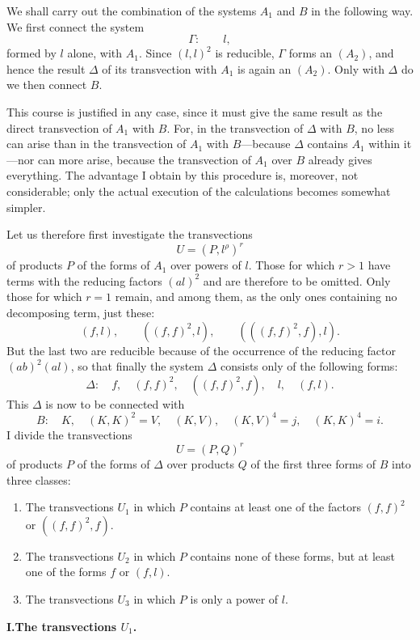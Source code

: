 \documentclass[10pt]{article}
\begin{document}
We shall carry out the combination of the systems $A_1$ and $B$ in the following way. We first connect the system
\[
\Gamma:
\qquad l,
\]
formed by $l$ alone, with $A_1$. Since $(l,l)^2$ is reducible, $\Gamma$ forms an $(A_2)$, and hence the result $\Delta$ of its transvection with $A_1$ is again an $(A_2)$. Only with $\Delta$ do we then connect $B$.

This course is justified in any case, since it must give the same result as the direct transvection of $A_1$ with $B$. For, in the transvection of $\Delta$ with $B$, no less can arise than in the transvection of $A_1$ with $B$---because $\Delta$ contains $A_1$ within it---nor can more arise, because the transvection of $A_1$ over $B$ already gives everything. The advantage I obtain by this procedure is, moreover, not considerable; only the actual execution of the calculations becomes somewhat simpler.

Let us therefore first investigate the transvections
\[
U=(P,l^\rho)^r
\]
of products $P$ of the forms of $A_1$ over powers of $l$. Those for which $r>1$ have terms with the reducing factors $(al)^2$ and are therefore to be omitted. Only those for which $r=1$ remain, and among them, as the only ones containing no decomposing term, just these:
\[
(f,l),
\qquad ((f,f)^2,l),
\qquad (((f,f)^2,f),l).
\]
But the last two are reducible because of the occurrence of the reducing factor $(ab)^2(al)$, so that finally the system $\Delta$ consists only of the following forms:
\[
\Delta:
\quad f,
\quad (f,f)^2,
\quad ((f,f)^2,f),
\quad l,
\quad (f,l).
\]
This $\Delta$ is now to be connected with
\[
B:
\quad K,
\quad (K,K)^2=V,
\quad (K,V),
\quad (K,V)^4=j,
\quad (K,K)^4=i.
\]
I divide the transvections
\[
U=(P,Q)^r
\]
of products $P$ of the forms of $\Delta$ over products $Q$ of the first three forms of $B$ into three classes:
\begin{enumerate}
\item[I.] The transvections $U_1$ in which $P$ contains at least one of the factors $(f,f)^2$ or $((f,f)^2,f)$.
\item[II.] The transvections $U_2$ in which $P$ contains none of these forms, but at least one of the forms $f$ or $(f,l)$.
\item[III.] The transvections $U_3$ in which $P$ is only a power of $l$.
\end{enumerate}

\begin{center}
{\bfseries I.\quad The transvections $U_1$.}
\end{center}
\end{document}
